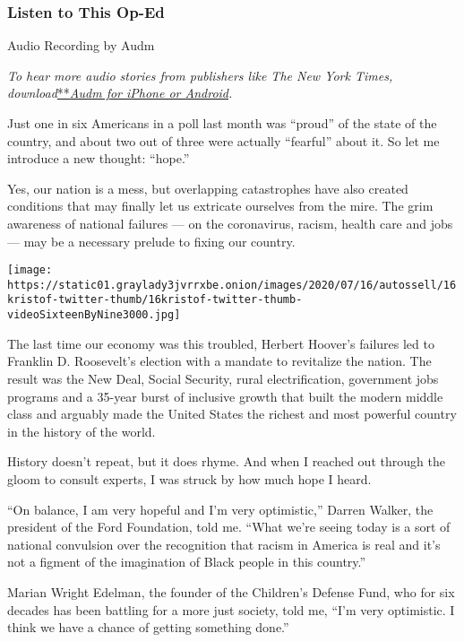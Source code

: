 \hypertarget{listen-to-this-op-ed}{%
\subsubsection{Listen to This Op-Ed}\label{listen-to-this-op-ed}}

Audio Recording by Audm

\emph{To hear more audio stories from publishers like The New York
Times,
download}\href{https://www.audm.com/?utm_source=nytmag\&utm_medium=embed\&utm_campaign=left_behind_draper}{**}\href{https://www.audm.com/?utm_source=nytopinion\&utm_medium=embed\&utm_campaign=interrupt_gloom_hope}{\emph{Audm
for iPhone or Android}}\emph{.}

Just one in six Americans in a poll last month was ``proud'' of the
state of the country, and about two out of three were actually
``fearful'' about it. So let me introduce a new thought: ``hope.''

Yes, our nation is a mess, but overlapping catastrophes have also
created conditions that may finally let us extricate ourselves from the
mire. The grim awareness of national failures --- on the coronavirus,
racism, health care and jobs --- may be a necessary prelude to fixing
our country.

\texttt{[image: https://static01.graylady3jvrrxbe.onion/images/2020/07/16/autossell/16kristof-twitter-thumb/16kristof-twitter-thumb-videoSixteenByNine3000.jpg]}

The last time our economy was this troubled, Herbert Hoover's failures
led to Franklin D. Roosevelt's election with a mandate to revitalize the
nation. The result was the New Deal, Social Security, rural
electrification, government jobs programs and a 35-year burst of
inclusive growth that built the modern middle class and arguably made
the United States the richest and most powerful country in the history
of the world.

History doesn't repeat, but it does rhyme. And when I reached out
through the gloom to consult experts, I was struck by how much hope I
heard.

``On balance, I am very hopeful and I'm very optimistic,'' Darren
Walker, the president of the Ford Foundation, told me. ``What we're
seeing today is a sort of national convulsion over the recognition that
racism in America is real and it's not a figment of the imagination of
Black people in this country.''

Marian Wright Edelman, the founder of the Children's Defense Fund, who
for six decades has been battling for a more just society, told me,
``I'm very optimistic. I think we have a chance of getting something
done.''

